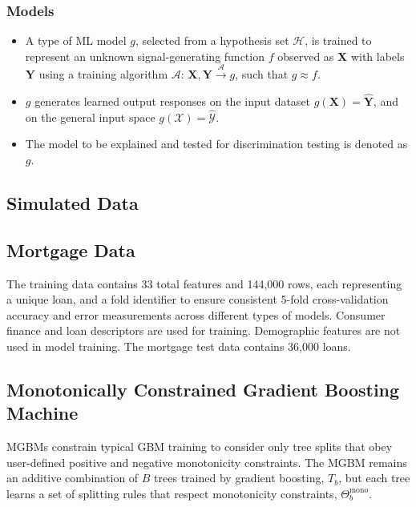 \documentclass[information,article,submit,moreauthors,pdftex]{definitions/mdpi}
\begin{document}
\subsubsection{Models}

	\begin{itemize}[leftmargin=*,labelsep=5.8mm]
		\item A type of ML model $g$, selected from a hypothesis set $\mathcal{H}$, is trained to represent an unknown signal-generating function $f$ observed as  $\mathbf{X}$ with labels $\mathbf{Y}$ using a training algorithm $\mathcal{A}$: 
		$ \mathbf{X}, \mathbf{Y} \xrightarrow{\mathcal{A}} g$, such that $g \approx f$.
		\item $g$ generates learned output responses on the input dataset $g(\mathbf{X}) = \mathbf{\hat{Y}}$, and on the general input space $g(\mathcal{X}) = \mathcal{\hat{Y}}$.
		\item The model to be explained and tested for discrimination testing is denoted as $g$.
	\end{itemize}

\subsection{Simulated Data}\label{ssec:sim_data}


\subsection{Mortgage Data}\label{ssec:mort_data}

The training data contains 33 total features and 144,000 rows, each representing a unique loan, and a fold identifier to ensure consistent 5-fold cross-validation accuracy and error measurements across different types of models. Consumer finance and loan descriptors are used for training. Demographic features are not used in model training. The mortgage test data contains 36,000 loans.

\subsection{Monotonically Constrained Gradient Boosting Machine}\label{ssec:mgbm}

MGBMs constrain typical GBM training to consider only tree splits that obey user-defined positive and negative monotonicity constraints. The MGBM remains an additive combination of $B$ trees trained by gradient boosting, $T_b$, but each tree learns a set of splitting rules that respect monotonicity constraints,  $\Theta^\text{mono}_b$. 
\end{document}
